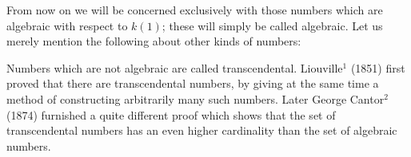 From now on we will be concerned exclusively with those numbers which are algebraic with respect to $k(1)$; these will simply be called algebraic. Let us merely mention the following about other kinds of numbers:

Numbers which are not algebraic are called transcendental. Liouville$^1$ (1851) first proved that there are transcendental numbers, by giving at the same time a method of constructing arbitrarily many such numbers. Later George Cantor$^2$ (1874) furnished a quite different proof which shows that the set of transcendental numbers has an even higher cardinality than the set of algebraic numbers.
